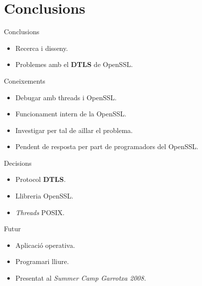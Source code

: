 \section{Conclusions}
    \begin{frame}{Conclusions}
        \begin{itemize}
\item Recerca i disseny.
\item Problemes amb el \textbf{DTLS} de OpenSSL.
        \end{itemize}
        \begin{block}{Coneixements}
        \begin{itemize}
\item Debugar amb threads i OpenSSL.
\item Funcionament intern de la OpenSSL.
\item Investigar per tal de aïllar el problema.
\item Pendent de resposta per part de programadors del OpenSSL.
        \end{itemize}
        \end{block}
        \begin{exampleblock}{Decisions}
        \begin{itemize}
\item Protocol \textbf{DTLS}.
\item Llibreria OpenSSL.
\item \emph{Threads} POSIX.
        \end{itemize}
        \end{exampleblock}
    \end{frame}
    \begin{frame}{Futur}
        \begin{itemize}
\item Aplicació operativa.
\item Programari lliure.
        \end{itemize}
        \begin{itemize}
\item Presentat al \emph{Summer Camp Garrotxa 2008.}
        \end{itemize}
    \end{frame}
